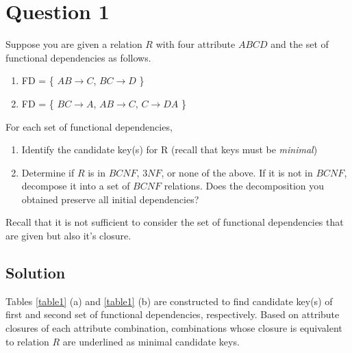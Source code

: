 
\section*{Question 1}

Suppose you are given a relation $R$ with four attribute $ABCD$ and the set of functional dependencies as follows.

\begin{enumerate}
\item FD = \{ $AB\rightarrow C$, $BC\rightarrow D$ \}
\item FD = \{ $BC\rightarrow A$, $AB\rightarrow C$, $C\rightarrow DA$ \}
\end{enumerate}

For each set of functional dependencies,

\begin{enumerate}[label=(\alph*)]
\item Identify the candidate key(s) for R (recall that keys must be \textit{minimal})
\item Determine if $R$ is in $BCNF$, $3NF$, or none of the above.
If it is not in $BCNF$, decompose it into a set of $BCNF$ relations.
Does the decomposition you obtained preserve all initial dependencies?
\end{enumerate}

Recall that it is not sufficient to consider the set of functional dependencies that are given but also it's closure.

\subsection*{Solution}

Tables \ref{table1} (a) and \ref{table1} (b) are constructed to find candidate key(s) of first and second set of functional dependencies, respectively.
Based on attribute closures of each attribute combination, combinations whose closure is equivalent to relation $R$ are underlined as minimal candidate keys.


